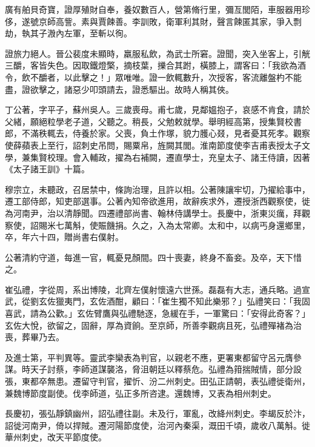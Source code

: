 \begin{pinyinscope}
 廣有舶貝奇寶，證厚殖財自奉，養奴數百人，營第脩行里，彌亙閭陌，車服器用珍侈，遂號京師高訾。素與賈餗善。李訓敗，衛軍利其財，聲言餗匿其家，爭入剽劫，執其子溵內左軍，至斬以徇。



 證旅力絕人。晉公裴度未顯時，羸服私飲，為武士所窘。證聞，突入坐客上，引觥三釂，客皆失色。因取鐵燈檠，摘枝葉，擽合其跗，橫膝上，謂客曰：「我欲為酒令，飲不釂者，以此擊之！」眾唯唯。證一飲輒數升，次授客，客流離盤杓不能盡，證欲擊之，諸惡少叩頭請去，證悉驅出。故時人稱其俠。



 丁公著，字平子，蘇州吳人。三歲喪母。甫七歲，見鄰媼抱子，哀感不肯食，請於父緒，願絕粒學老子道，父聽之。稍長，父勉敕就學。舉明經高第，授集賢校書郎，不滿秩輒去，侍養於家。父喪，負土作塚，貌力臒心叕，見者憂其死孝。觀察使薛蘋表上至行，詔刺史吊問，賜粟帛，旌闕其閭。淮南節度使李吉甫表授太子文學，兼集賢校理。會入輔政，擢為右補闕，遷直學士，充皇太子、諸王侍讀，因著《太子諸王訓》十篇。



 穆宗立，未聽政，召居禁中，條詢治理，且許以相。公著陳讓牢切，乃擢給事中，遷工部侍郎，知吏部選事。公著內知帝欲進用，故辭疾求外，遷授浙西觀察使，徙為河南尹，治以清靜聞。四遷禮部尚書、翰林侍講學士。長慶中，浙東災癘，拜觀察使，詔賜米七萬斛，使賑饑捐。久之，入為太常卿。太和中，以病丐身還鄉里，卒，年六十四，贈尚書右僕射。



 公著清約守道，每進一官，輒憂見顏間。四十喪妻，終身不畜妾。及卒，天下惜之。



 崔弘禮，字從周，系出博陵，北齊左僕射懷遠六世孫。磊磊有大志，通兵略。過宣武，從劉玄佐獵夷門，玄佐酒酣，顧曰：「崔生獨不知此樂邪？」弘禮笑曰：「我固喜武，請為公歡。」玄佐臂鷹與弘禮馳逐，急緩在手，一軍驚曰：「安得此奇客？」玄佐大悅，欲留之，固辭，厚為資餉。至京師，所善李觀病且死，弘禮殫褚為治喪，葬畢乃去。



 及進士第，平判異等。靈武李欒表為判官，以親老不應，更署東都留守呂元膺參謀。時天子討蔡，李師道謀襲洛，脅沮朝廷以釋蔡危。弘禮為箝揣賊情，部分設張，東都卒無患。遷留守判官，擢忻、汾二州刺史。田弘正請朝，表弘禮徙衛州，兼魏博節度副使。伐李師道，弘正多所咨逮。還魏博，又表為相州刺史。



 長慶初，張弘靜鎮幽州，詔弘禮往副。未及行，軍亂，改絳州刺史。李朅反於汴，詔徙河南尹，倚以捍賊。遷河陽節度使，治河內秦渠，溉田千頃，歲收八萬斛。徙華州刺史，改天平節度使。




\end{pinyinscope}
